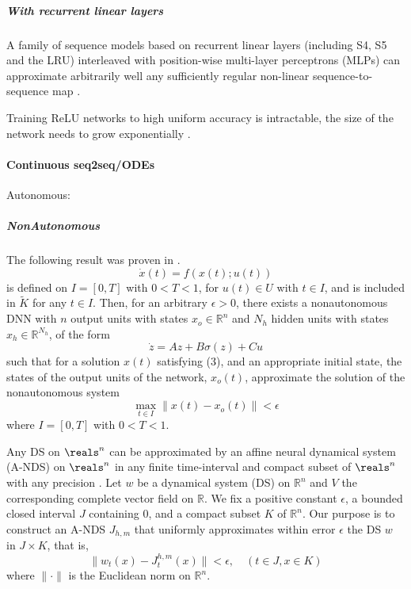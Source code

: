 \documentclass{article}
\theoremstyle{definition}
\theoremstyle{remark}
\begin{document}
\subparagraph{With recurrent linear layers}
A family of sequence models based on recurrent linear layers (including S4, S5 and the LRU) interleaved with position-wise multi-layer perceptrons (MLPs) can approximate arbitrarily well any sufficiently regular non-linear sequence-to-sequence map \citep{orvieto2023a}.

Training ReLU networks to high uniform accuracy is intractable, the size of the network needs to grow exponentially \citep{berner2022}.




\paragraph{Continuous seq2seq/ODEs}
Autonomous: \citep{funahashi1993approximation}

\subparagraph{NonAutonomous}
The following result was proven in \citet{garces2012strategies}.
\[
\dot{x}(t) = f(x(t); u(t)) 
\]
is defined on \( I = [0, T] \) with \( 0 < T < 1 \), for \( u(t) \in U \) with \( t \in I \), and is included in \( \tilde{K} \) for any \( t \in I \).
Then, for an arbitrary \( \epsilon > 0 \), there exists a nonautonomous DNN with \( n \) output units with states \( x_o \in \mathbb{R}^n \) and \( N_h \) hidden units with states \( x_h \in \mathbb{R}^{N_h} \), of the form
\[
\dot{z} = Az + B \sigma(z) + C u
\]
such that for a solution \( x(t) \) satisfying (3), and an appropriate initial state, the states of the output units of the network, \( x_o(t) \), approximate the solution of the nonautonomous system
\[
\max_{t \in I} \| x(t) - x_o(t) \| < \epsilon
\]
where \( I = [0, T] \) with \( 0 < T < 1 \).


Any DS on $\reals^n$ can be approximated by an affine neural dynamical system (A-NDS) on $\reals^n$ in any finite time-interval and compact subset of $\reals^n$ with any precision \citep{kimura1998learning}.
Let \( w \) be a dynamical system (DS) on \( \mathbb{R}^n \) and \( V \) the corresponding complete vector field on \( \mathbb{R} \). We fix a positive constant \( \epsilon \), a bounded closed interval \( J \) containing 0, and a compact subset \( K \) of \( \mathbb{R}^n \). Our purpose is to construct an A-NDS \( J_{h,m} \) that uniformly approximates within error \( \epsilon \) the DS \( w \) in \( J \times K \), that is,
\begin{equation}\label{eq:kimurabound}
\| w_t(x) - J_t^{h,m}(x) \| < \epsilon, \quad (t \in J, x \in K)
\end{equation}
where \( \|\cdot\| \) is the Euclidean norm on \( \mathbb{R}^n \).
\end{document}
